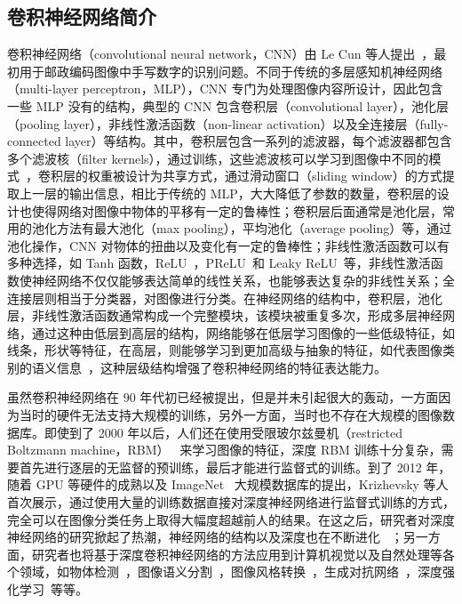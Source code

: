 \subsection{卷积神经网络简介}
卷积神经网络（convolutional neural network，CNN）由 Le Cun 等人提出~\cite{Lecun1990HandwrittenZC,LeCun1998GradientbasedLA}，最初用于邮政编码图像中手写数字的识别问题。不同于传统的多层感知机神经网络（multi-layer perceptron，MLP），CNN 专门为处理图像内容所设计，因此包含一些 MLP 没有的结构，典型的 CNN 包含卷积层（convolutional layer），池化层（pooling layer），非线性激活函数（non-linear activation）以及全连接层（fully-connected layer）等结构。其中，卷积层包含一系列的滤波器，每个滤波器都包含多个滤波核（filter kernels），通过训练，这些滤波核可以学习到图像中不同的模式~\cite{Zeiler2014VisualizingAU,Krizhevsky2012ImageNetCW}，卷积层的权重被设计为共享方式，通过滑动窗口（sliding window）的方式提取上一层的输出信息，相比于传统的 MLP，大大降低了参数的数量，卷积层的设计也使得网络对图像中物体的平移有一定的鲁棒性；卷积层后面通常是池化层，常用的池化方法有最大池化（max pooling），平均池化（average pooling）等，通过池化操作，CNN 对物体的扭曲以及变化有一定的鲁棒性；非线性激活函数可以有多种选择，如 Tanh 函数，ReLU~\cite{Glorot2011DeepSR}，PReLU~\cite{He2015DelvingDI}和 Leaky ReLU~\cite{maas2013rectifier}等，非线性激活函数使神经网络不仅仅能够表达简单的线性关系，也能够表达复杂的非线性关系；全连接层则相当于分类器，对图像进行分类。在神经网络的结构中，卷积层，池化层，非线性激活函数通常构成一个完整模块，该模块被重复多次，形成多层神经网络，通过这种由低层到高层的结构，网络能够在低层学习图像的一些低级特征，如线条，形状等特征，在高层，则能够学习到更加高级与抽象的特征，如代表图像类别的语义信息~\cite{Krizhevsky2012ImageNetCW}，这种层级结构增强了卷积神经网络的特征表达能力。

虽然卷积神经网络在 90 年代初已经被提出，但是并未引起很大的轰动，一方面因为当时的硬件无法支持大规模的训练，另外一方面，当时也不存在大规模的图像数据库。即使到了 2000 年以后，人们还在使用受限玻尔兹曼机（restricted Boltzmann machine，RBM）~\cite{Salakhutdinov2009DeepBM,Salakhutdinov2012AnEL} 来学习图像的特征，深度 RBM 训练十分复杂，需要首先进行逐层的无监督的预训练，最后才能进行监督式的训练。到了 2012 年，随着 GPU 等硬件的成熟以及 ImageNet~\cite{Russakovsky2015ImageNetLS} 大规模数据库的提出，Krizhevsky 等人~\cite{Krizhevsky2012ImageNetCW} 首次展示，通过使用大量的训练数据直接对深度神经网络进行监督式训练的方式，完全可以在图像分类任务上取得大幅度超越前人的结果。在这之后，研究者对深度神经网络的研究掀起了热潮，神经网络的结构以及深度也在不断进化~
\cite{Zeiler2014VisualizingAU,Simonyan2014VeryDC,Szegedy2015GoingDW,He2016DeepRL,Huang2017DenselyCC}；另一方面，研究者也将基于深度卷积神经网络的方法应用到计算机视觉以及自然处理等各个领域，如物体检测~\cite{Liu2016SSDSS,Redmon2016YouOL,Lin2017FocalLF,Ren2017FasterRT}，图像语义分割~\cite{Shelhamer2017FullyCN,Chen2018DeepLabSI,Noh2015LearningDN}，图像风格转换~\cite{Gatys2016ImageST,Johnson2016PerceptualLF}，生成对抗网络~\cite{Goodfellow2014GenerativeAN,Mirza2014ConditionalGA}，深度强化学习~\cite{Mnih2015HumanlevelCT,Silver2016MasteringTG}等等。

